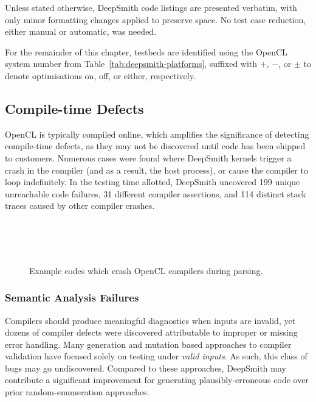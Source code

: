 Unless stated otherwise, DeepSmith code listings are presented verbatim, with only minor formatting changes applied to preserve space. No test case reduction, either manual or automatic, was needed.

For the remainder of this chapter, testbeds are identified using the OpenCL system number from Table~\ref{tab:deepsmith-platforms}, suffixed with $+$, $-$, or $\pm$ to denote optimisations on, off, or either, respectively.


\subsection{Compile-time Defects}%
\label{subsec:compile-time-defects}

OpenCL is typically compiled online, which amplifies the significance of detecting compile-time defects, as they may not be discovered until code has been shipped to customers. Numerous cases were found where DeepSmith kernels trigger a crash in the compiler (and as a result, the host process), or cause the compiler to loop indefinitely. In the testing time allotted, DeepSmith uncovered 199 unique unreachable code failures, 31 different compiler assertions, and 114 distinct stack traces caused by other compiler crashes.


\begin{figure}
  \centering %
  \\%
  \\%
  \\%
  \caption[Example codes which crash parsers]{%
    Example codes which crash OpenCL compilers during parsing.%
  }
  \label{lst:parser-crashes}
\end{figure}


\subsubsection{Semantic Analysis Failures}

Compilers should produce meaningful diagnostics when inputs are invalid, yet dozens of compiler defects were discovered attributable to improper or missing error handling. Many generation and mutation based approaches to compiler validation have focused solely on testing under \emph{valid inputs}. As such, this class of bugs may go undiscovered. Compared to these approaches, DeepSmith may contribute a significant improvement for generating plausibly-erroneous code over prior random-enumeration approaches.

